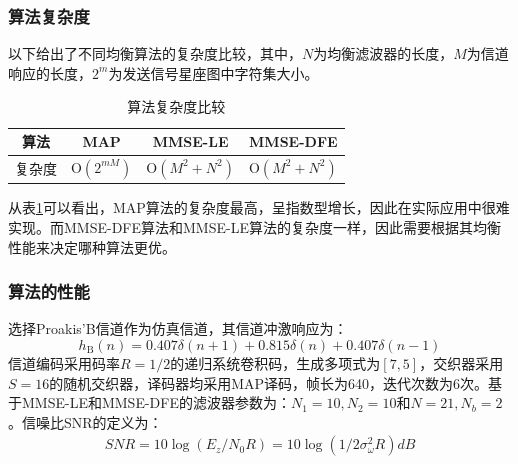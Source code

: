\subsubsection*{算法复杂度}
以下给出了不同均衡算法的复杂度比较，其中，$N$为均衡滤波器的长度，$M$为信道响应的长度，$2^m$为发送信号星座图中字符集大小。

\begin{table}[hbt]
  \centering
  \caption{算法复杂度比较}
  \label{tab:2.1}
  \begin{threeparttable}
  \begin{tabular}{cccc}
    \hline
    算法&MAP&MMSE-LE&MMSE-DFE\\
    \hline
    复杂度&$\mathrm{O}(2^{mM})$&$\mathrm{O}(M^2+N^2)$&$\mathrm{O}(M^2+N^2)$\\
    \hline
  \end{tabular}
\end{threeparttable}
\end{table}

从表\ref{tab:2.1}可以看出，MAP算法的复杂度最高，呈指数型增长，因此在实际应用中很难实现。而MMSE-DFE算法和MMSE-LE算法的复杂度一样，因此需要根据其均衡性能来决定哪种算法更优。
\subsubsection*{算法的性能}
选择Proakis'B信道作为仿真信道，其信道冲激响应为：
\begin{equation}
    h_{\mathrm{B}}(n)=0.407\delta(n+1)+0.815\delta(n)+0.407\delta(n-1)
    \label{equ:2.36}
\end{equation}
信道编码采用码率$R=1/2$的递归系统卷积码，生成多项式为$[7,5]$，交织器采用$S=16$的随机交织器，译码器均采用MAP译码，帧长为640，迭代次数为6次。基于MMSE-LE和MMSE-DFE的滤波器参数为：$N_1=10,N_2=10$和$N=21,N_b=2$。信噪比SNR的定义为：
\begin{eqnarray}
    SNR=10\log(E_z/N_0R)=10\log(1/2\sigma^2_\omega R)dB
    \label{equ:2.37}
\end{eqnarray}

